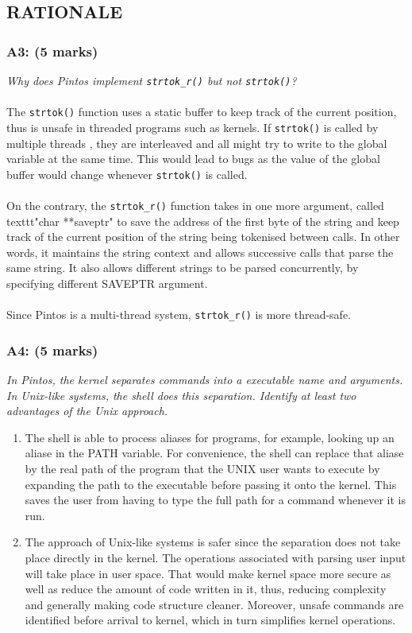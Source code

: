\documentclass{article}
\begin{document}
\subsection{RATIONALE}

\subsubsection*{A3: (5 marks) }
\textit{Why does Pintos implement \texttt{strtok\_r()} but not \texttt{strtok()}?}
\\ \\
The \texttt{strtok()} function uses a static buffer to keep track of the current position, thus is unsafe in threaded programs such as kernels. If \texttt{strtok()} is called by multiple threads ,  they are interleaved and all might try to write to the global variable at the same time. This would lead to bugs as the value of the global buffer would change whenever \texttt{strtok()} is called.
\\ \\
On the contrary, the \texttt{strtok\_r()} function takes in one more argument, called texttt{"char **saveptr"} to save the address of the first byte of the string and keep track of the current position of the string being tokenised between calls. In other words, it maintains the string context and allows successive calls that parse the same string. It also allows different strings to be parsed concurrently, by specifying different SAVEPTR argument.
\\ \\
Since Pintos is a multi-thread system, \texttt{strtok\_r()} is more thread-safe.



\subsubsection*{A4: (5 marks) }
\textit{In Pintos, the kernel separates commands into a executable name and
arguments. In Unix-like systems, the shell does this separation. Identify at
least two advantages of the Unix approach.}
\begin{enumerate}
  \item The shell is able to process aliases for programs, for example, looking up an aliase in the PATH variable. For convenience, the shell can replace that aliase by the real path of the program that the UNIX user wants to execute by expanding the path to the executable before passing it onto the kernel. This saves the user from having to type the full path for a command whenever it is run.

  \item The approach of Unix-like systems is safer since the separation does not take place directly in the kernel. The operations associated with parsing user input will take place in user space. That would make kernel space more secure as well as reduce the  amount of code written in it, thus, reducing complexity and generally making code structure cleaner. Moreover, unsafe commands are identified before arrival to kernel, which in turn simplifies kernel operations.
\end{enumerate}
\end{document}
